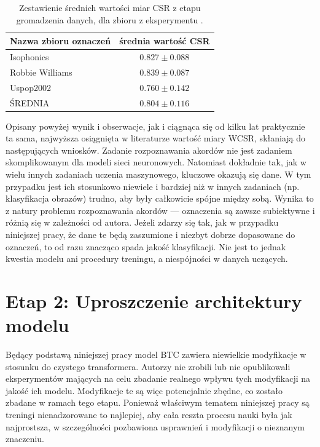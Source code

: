 \begin{table}
    \centering
    \caption{Zestawienie średnich wartości miar CSR z etapu gromadzenia danych, dla zbioru z eksperymentu .}
    \label{tab:results_btc-reproduce_extra}
    \begin{tabular}{|l|c|}
        \hline Nazwa zbioru oznaczeń & średnia wartość CSR \\ \hline
        Isophonics  & $0.827 \pm 0.088$ \\
        Robbie Williams & $0.839 \pm 0.087$ \\
        Uspop2002 & $0.760 \pm 0.142$ \\
        \hline ŚREDNIA & $0.804 \pm 0.116$ \\ \hline
    \end{tabular}
\end{table}

Opisany powyżej wynik i obserwacje, jak i ciągnąca się od kilku lat praktycznie ta sama, najwyższa osiągnięta w literaturze wartość miary WCSR, skłaniają do następujących wniosków. Zadanie rozpoznawania akordów nie jest zadaniem skomplikowanym dla modeli sieci neuronowych. Natomiast dokładnie tak, jak w wielu innych zadaniach uczenia maszynowego, kluczowe okazują się dane. W tym przypadku jest ich stosunkowo niewiele i bardziej niż w innych zadaniach (np. klasyfikacja obrazów) trudno, aby były całkowicie spójne między sobą. Wynika to z natury problemu rozpoznawania akordów --- oznaczenia są zawsze subiektywne i różnią się w zależności od autora. Jeżeli zdarzy się tak, jak w przypadku niniejszej pracy, że dane te będą zaszumione i niezbyt dobrze dopasowane do oznaczeń, to od razu znacząco spada jakość klasyfikacji. Nie jest to jednak kwestia modelu ani procedury treningu, a niespójności w danych uczących.



\section{Etap 2: Uproszczenie architektury modelu}

Będący podstawą niniejszej pracy model BTC zawiera niewielkie modyfikacje w stosunku do czystego transformera. Autorzy nie zrobili lub nie opublikowali eksperymentów mających na celu zbadanie realnego wpływu tych modyfikacji na jakość ich modelu. Modyfikacje te są więc potencjalnie zbędne, co zostało zbadane w ramach tego etapu. Ponieważ właściwym tematem niniejszej pracy są treningi nienadzorowane to najlepiej, aby cała reszta procesu nauki była jak najprostsza, w szczególności pozbawiona usprawnień i modyfikacji o nieznanym znaczeniu.


